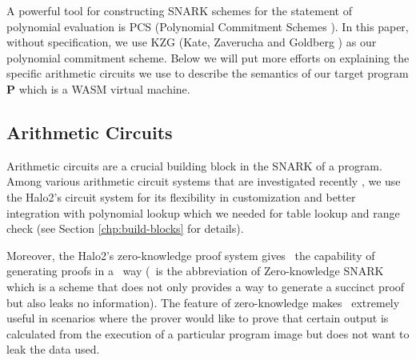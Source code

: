 \smallskip A powerful tool for constructing SNARK schemes for the statement of polynomial evaluation is PCS (Polynomial Commitment Schemes \cite{boneh2020halo-pcs,boneh2020efficient-pcs,kate2010polynomial-pcs}). In this paper, without specification, we use KZG (Kate, Zaverucha and Goldberg \cite{kate2010polynomial-pcs}) as our polynomial commitment scheme. Below we will put more efforts on explaining the specific arithmetic circuits we use to describe the semantics of our target program $\mathbf{P}$ which is a WASM virtual machine.


\subsection{Arithmetic Circuits}
\label{chp:arith-circuits}
Arithmetic circuits are a crucial building block in the SNARK of a program. Among various arithmetic circuit systems that are investigated recently \cite{hoffmann2019efficient-r1cs, gabizon2019plonk, pearson2022plonkup}, we use the Halo2's \cite{halo2book} circuit system for its flexibility in customization and better integration with polynomial lookup which we needed for table lookup and range check (see Section \ref{chp:build-blocks} for details).

Moreover, the Halo2's zero-knowledge proof system gives \zkwasm\, the capability of generating proofs in a \zksnark\, way (\zksnark\, is the abbreviation of Zero-knowledge SNARK which is a scheme that does not only provides a way to generate a succinct proof but also leaks no information). The feature of zero-knowledge makes \zkwasm\, extremely useful in scenarios where the prover would like to prove that certain output is calculated from the execution of a particular program image but does not want to leak the data used.

